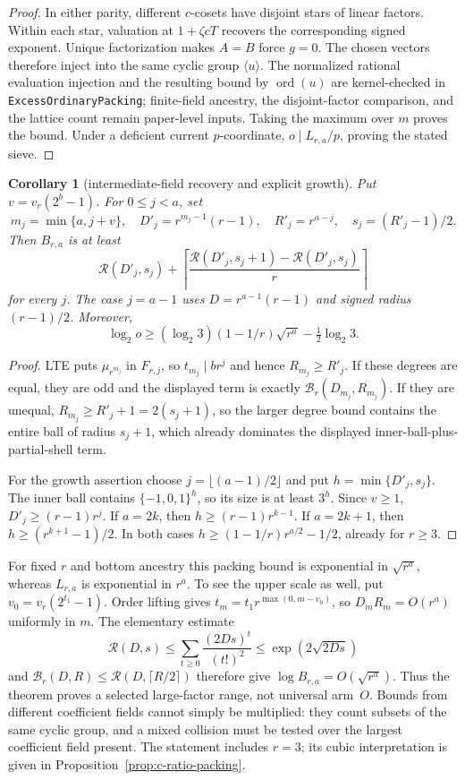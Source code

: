 \documentclass[11pt]{article}
\newtheorem{corollary}[theorem]{Corollary}
\theoremstyle{definition}
\theoremstyle{remark}
\begin{document}
\begin{proof}
In either parity, different $c$-cosets have disjoint stars of linear
factors.  Within each star, valuation at $1+\zeta cT$ recovers the
corresponding signed exponent.  Unique factorization makes $A=B$
force $g=0$.  The chosen vectors therefore inject into the same cyclic
group $\langle u\rangle$.  The normalized rational evaluation injection
and the resulting bound by $\operatorname{ord}(u)$ are kernel-checked in
\texttt{ExcessOrdinaryPacking}; finite-field ancestry, the disjoint-factor
comparison, and the lattice count remain paper-level inputs.  Taking the
maximum over $m$ proves the bound.
Under a deficient current $p$-coordinate, $o\mid L_{r,a}/p$, proving
the stated sieve.
\end{proof}

\begin{corollary}[intermediate-field recovery and explicit growth]
\label{cor:o-ratio-growth}
Put $v=v_r(2^b-1)$.  For $0\le j<a$, set
\[
 m_j=\min\{a,j+v\},\quad
 D'_j=r^{m_j-1}(r-1),\quad R'_j=r^{a-j},\quad s_j=(R'_j-1)/2.
\]
Then $B_{r,a}$ is at least
\[
 \mathcal R(D'_j,s_j)+
 \left\lceil\frac{\mathcal R(D'_j,s_j+1)-\mathcal R(D'_j,s_j)}r
 \right\rceil
\]
for every $j$.  The case $j=a-1$ uses
$D=r^{a-1}(r-1)$ and signed radius $(r-1)/2$.  Moreover,
\[
 \log_2 o\ge
 (\log_2 3)(1-1/r)\sqrt{r^a}-\tfrac12\log_2 3.
\]
\end{corollary}

\begin{proof}
LTE puts $\mu_{r^{m_j}}$ in $F_{r,j}$, so
$t_{m_j}\mid br^j$ and hence $R_{m_j}\ge R'_j$.
If these degrees are equal, they are odd and the displayed term is
exactly $\mathcal B_r(D_{m_j},R_{m_j})$.
If they are unequal, $R_{m_j}\ge R'_j+1=2(s_j+1)$, so the larger
degree bound contains the entire ball of radius $s_j+1$, which already
dominates the displayed inner-ball-plus-partial-shell term.

For the growth assertion choose $j=\lfloor(a-1)/2\rfloor$ and put
$h=\min\{D'_j,s_j\}$.  The inner ball contains $\{-1,0,1\}^h$,
so its size is at least $3^h$.  Since $v\ge1$,
$D'_j\ge(r-1)r^j$.  If $a=2k$, then
$h\ge(r-1)r^{k-1}$.  If $a=2k+1$, then
$h\ge(r^{k+1}-1)/2$.  In both cases
$h\ge(1-1/r)r^{a/2}-1/2$, already for $r\ge3$.
\end{proof}

For fixed $r$ and bottom ancestry this packing bound is exponential in
$\sqrt{r^a}$, whereas $L_{r,a}$ is exponential in $r^a$.  To see the upper
scale as well, put $v_0=v_r(2^{t_1}-1)$.  Order lifting gives
$t_m=t_1r^{\max(0,m-v_0)}$, so $D_mR_m=O(r^a)$ uniformly in $m$.
The elementary estimate
\[
 \mathcal R(D,s)\le\sum_{t\ge0}\frac{(2Ds)^t}{(t!)^2}
 \le\exp(2\sqrt{2Ds})
\]
and $\mathcal B_r(D,R)\le\mathcal R(D,\lceil R/2\rceil)$ therefore give
$\log B_{r,a}=O(\sqrt{r^a})$.  Thus the theorem proves a selected
large-factor range, not universal arm~$O$.  Bounds from different coefficient
fields cannot simply be multiplied: they count subsets of the same cyclic
group, and a mixed collision must be tested over the largest coefficient
field present.  The statement includes $r=3$; its cubic interpretation is
given in Proposition~\ref{prop:c-ratio-packing}.
\end{document}
